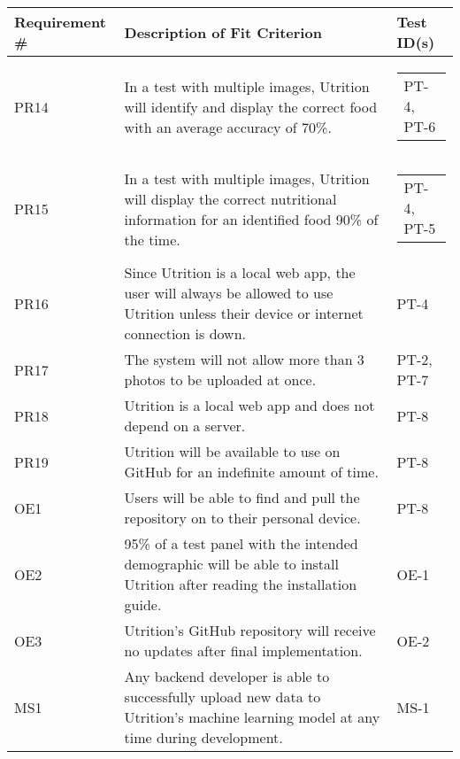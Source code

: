 \documentclass[12pt, titlepage]{article}
\begin{document}
	\begin{table}[H]
		\begin{tabularx}{\textwidth}{|l|X|l|}
			\hline
			{\bf Requirement \#} & {\bf Description of Fit Criterion} & {\bf Test ID(s)}\\
			\hline
			PR14 & In a test with multiple images, Utrition will identify and 
			display the correct food with an average accuracy of 70\%. & 
			\begin{tabular}[c]{@{}l@{}}PT-4, PT-6 \end{tabular}\\
			\hline
			PR15 & In a test with multiple images, Utrition will display the 
			correct nutritional information for an identified food 90\% of the 
			time. & \begin{tabular}[c]{@{}l@{}}PT-4, PT-5 \end{tabular}\\
			\hline
			PR16 & Since Utrition is a local web app, the user will always be allowed to use Utrition unless their device or internet connection is down. & PT-4\\
			\hline
			PR17 & The system will not allow more than 3 photos to be uploaded at once. & PT-2, PT-7\\
			\hline
			PR18 & Utrition is a local web app and does not depend on a server. & PT-8\\
			\hline
			PR19 & Utrition will be available to use on GitHub for an indefinite amount of time. & PT-8\\
			\hline
			OE1 & Users will be able to find and pull the repository on to their personal device. & PT-8\\
			\hline
			OE2 & 95\% of a test panel with the intended demographic will be able to install Utrition after reading the installation guide. & OE-1\\
			\hline
			OE3 & Utrition’s GitHub repository will receive no updates after final implementation. & OE-2\\
			\hline
			MS1 & Any backend developer is able to successfully upload new data to Utrition’s machine learning model at any time during development.  & MS-1\\
			\hline
		\end{tabularx}
	\end{table}
	
\end{document}
